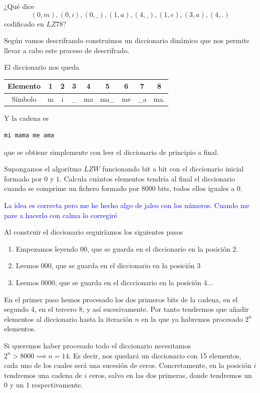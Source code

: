 \begin{problem}[15]
¿Qué dice
\[(0,m),(0,i),(0,\_),(1,a),(4,\_),(1,e),(3,a),(4,.)\]
codificado en $LZ78$?
\solution

Según vamos descrifrando construimos un diccionario dinámico que nos permite llevar a cabo este proceso de descrifrado.

El diccionario nos queda

\begin{center}
\begin{tabular}{ | c | c | c | c | c | c | c | c | c |}
   \hline
   Elemento & 1 & 2 & 3 & 4 & 5 & 6 & 7 & 8 \\
   \hline
   Símbolo & m & i & \_ & ma & ma\_ & me & \_a & ma.\\
   \hline
 \end{tabular}
\end{center}

Y la cadena es
\begin{verbatim}
mi mama me ama
\end{verbatim}
que se obtiene simplemente con leer el diccionario de principio a final.
\end{problem}

\begin{problem}[16]
Supongamos el algoritmo $LZW$ funcionando bit a bit con el diccionario inicial formado por $0$ y $1$. Calcula cuántos elementos tendría al final el diccionario cuando se comprime un fichero formado por 8000 bits, todos ellos iguales a 0.
\solution

\yoP

\textcolor{blue}{La idea es correcta pero me he hecho algo de jaleo con los números. Cuando me pare a hacerlo con calma lo corregiré}

Al construir el diccionario seguiríamos los siguientes pasos
\begin{enumerate}
\item Empezamos leyendo 00, que se guarda en el diccionario en la posición 2.
\item Leemos 000, que se guarda en el diccionario en la posición 3
\item Leemos 0000, que se guarda en el dicccionario en la posición 4...
\end{enumerate}

En el primer paso hemos procesado los dos primeros bits de la cadena, en el segundo 4, en el tercero 8, y así sucesivamente. Por tanto tendremos que añadir elementos al diccionario hasta la iteración $n$ en la que ya habremos procesado $2^n$ elementos.

Si queremos haber procesado todo el diccionario necesitamos $2^n>8000 \implies n =14$. Es decir, nos quedará un diccionario con 15 elementos, cada uno de los cuales será una sucesión de ceros. Concretamente, en la posición $i$ tendremos una cadena de $i$ ceros, salvo en las dos primeras, donde tendremos un 0 y un 1 respectivamente.
\end{problem}

